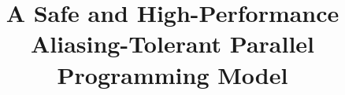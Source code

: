 \documentclass[9pt,nocopyrightspace,preprint]{sigplanconf}
\begin{document}
\title{A Safe and High-Performance Aliasing-Tolerant Parallel Programming Model}
\authorinfo{}{}{}
\maketitle
\end{document}
